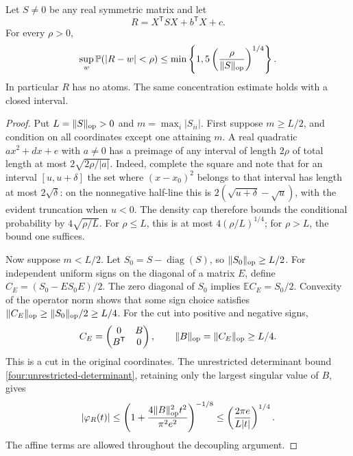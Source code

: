 \begin{lemma}\label{four:quarter}
Let \(S\ne0\) be any real symmetric matrix and let
\[
 R=X^{\mathsf T}SX+b^{\mathsf T}X+c.
\]
For every \(\rho>0\),
\begin{equation}\label{four:quarter-bound}
 \sup_w\mathbb P(|R-w|<\rho)
 \leq\min\left\{1,5\left(\frac{\rho}{\|S\|_{\rm op}}\right)^{1/4}\right\}.
\end{equation}
In particular \(R\) has no atoms.  The same concentration estimate
holds with a closed interval.
\end{lemma}
\begin{proof}
Put \(L=\|S\|_{\rm op}>0\) and \(m=\max_i|S_{ii}|\).
First suppose \(m\geq L/2\), and condition on all coordinates
except one attaining \(m\).
A real quadratic \(ax^2+dx+e\) with \(a\ne0\) has a preimage
of any interval of length \(2\rho\) of total length at most
\(2\sqrt{2\rho/|a|}\).  Indeed, complete the square and note
that for an interval \([u,u+\delta]\) the set where
\((x-x_0)^2\) belongs to that interval has length at most
\(2\sqrt\delta\): on the nonnegative half-line this is
\(2(\sqrt{u+\delta}-\sqrt u)\), with the evident truncation
when \(u<0\).
The density cap therefore bounds the conditional probability by
\(4\sqrt{\rho/L}\).
For \(\rho\leq L\), this is at most
\(4(\rho/L)^{1/4}\); for \(\rho>L\), the bound one suffices.

Now suppose \(m<L/2\).  Let \(S_0=S-\operatorname{diag}(S)\),
so \(\|S_0\|_{\rm op}\geq L/2\).
For independent uniform signs on the diagonal of a matrix \(E\),
define \(C_E=(S_0-ES_0E)/2\).
The zero diagonal of \(S_0\) implies
\(\mathbb EC_E=S_0/2\).  Convexity of the operator norm shows
that some sign choice satisfies
\(\|C_E\|_{\rm op}\geq\|S_0\|_{\rm op}/2\geq L/4\).
For the cut into positive and negative signs,
\[
 C_E=\begin{pmatrix}0&B\\B^{\mathsf T}&0\end{pmatrix},
 \qquad \|B\|_{\rm op}=\|C_E\|_{\rm op}\geq L/4 .
\]
This is a cut in the original coordinates.
The unrestricted determinant bound
\eqref{four:unrestricted-determinant}, retaining only the
largest singular value of \(B\), gives
\begin{equation}\label{four:quarter-decay}
 |\varphi_R(t)|
 \leq\left(1+\frac{4\|B\|_{\rm op}^2t^2}{\pi^2e^2}\right)^{-1/8}
 \leq\left(\frac{2\pi e}{L|t|}\right)^{1/4}.
\end{equation}
The affine terms are allowed throughout the decoupling argument.


\end{proof}
